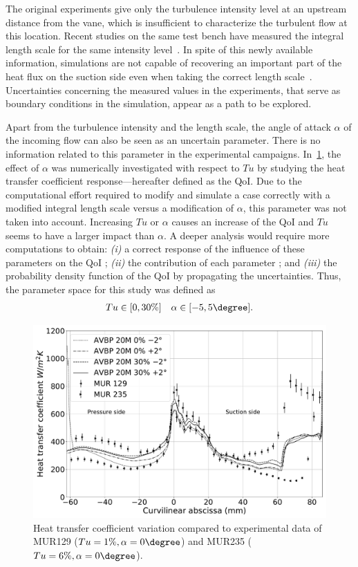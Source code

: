 The original experiments give only the turbulence intensity level at an upstream distance from the vane, which is insufficient to characterize the turbulent flow at this location. Recent studies on the same test bench have measured the integral length scale for the same intensity level~\cite{Fontaneto2014}. In spite of this newly available information, simulations are not capable of recovering an important part of the heat flux on the suction side even when taking the correct length scale~\cite{Pichler2016}. Uncertainties concerning the measured values in the experiments, that serve as boundary conditions in the simulation, appear as a path to be explored. 

Apart from the turbulence intensity and the length scale, the angle of attack $\alpha$ of the incoming flow can also be seen as an uncertain parameter. There is no information related to this parameter in the experimental campaigns. In~\cref{fig:space-tu-alpha}, the effect of $\alpha$ was numerically investigated with respect to $Tu$ by studying the heat transfer coefficient response---hereafter defined as the QoI. Due to the computational effort required to modify and simulate a case correctly with a modified integral length scale versus a modification of $\alpha$, this parameter was not taken into account. Increasing $Tu$ or $\alpha$ causes an increase of the QoI and $Tu$ seems to have a larger impact than $\alpha$. A deeper analysis would require more computations to obtain: \textit{(i)} a correct response of the influence of these parameters on the QoI ; \textit{(ii)} the contribution of each parameter ; and \textit{(iii)} the probability density function of the QoI by propagating the uncertainties. Thus, the parameter space for this study was defined as
\begin{align}
Tu \in [0, 30\%] \quad \alpha \in [-5,5\degree].
\end{align}

\begin{figure}[!h]
\centering
\includegraphics[width=0.9\linewidth,keepaspectratio]{fig/applications/ls89/11_2column_color-online-only_space_tu-alpha.pdf}
\caption{Heat transfer coefficient variation compared to experimental data of MUR129 ($Tu=1\%, \alpha = 0\degree$) and MUR235 ($Tu=6\%, \alpha = 0\degree$).}
\label{fig:space-tu-alpha}
\end{figure}

